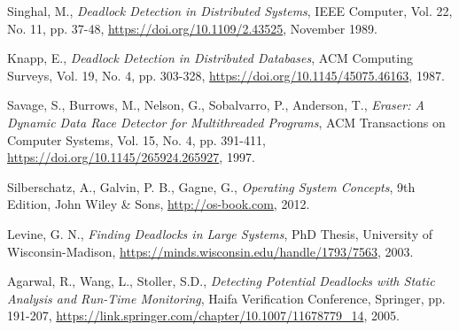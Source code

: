 \begin{thebibliography}{12}
  Singhal, M.,
  \emph{Deadlock Detection in Distributed Systems},
  IEEE Computer, Vol. 22, No. 11, pp. 37-48,
  \url{https://doi.org/10.1109/2.43525}, November 1989.

  Knapp, E.,
  \emph{Deadlock Detection in Distributed Databases},
  ACM Computing Surveys, Vol. 19, No. 4, pp. 303-328,
  \url{https://doi.org/10.1145/45075.46163}, 1987.

  Savage, S., Burrows, M., Nelson, G., Sobalvarro, P., Anderson, T.,
  \emph{Eraser: A Dynamic Data Race Detector for Multithreaded Programs},
  ACM Transactions on Computer Systems, Vol. 15, No. 4, pp. 391-411,
  \url{https://doi.org/10.1145/265924.265927}, 1997.

  Silberschatz, A., Galvin, P. B., Gagne, G.,
  \emph{Operating System Concepts},
  9th Edition, John Wiley \& Sons,
  \url{http://os-book.com}, 2012.

  Levine, G. N.,
  \emph{Finding Deadlocks in Large Systems},
  PhD Thesis, University of Wisconsin-Madison,
  \url{https://minds.wisconsin.edu/handle/1793/7563}, 2003.

  Agarwal, R., Wang, L., Stoller, S.D.,
  \emph{Detecting Potential Deadlocks with Static Analysis and Run-Time Monitoring},
  Haifa Verification Conference, Springer, pp. 191-207,
  \url{https://link.springer.com/chapter/10.1007/11678779_14}, 2005.
\end{thebibliography}
